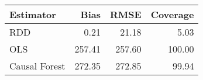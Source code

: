\begin{table}[ht]
\centering
\begin{tabular}{lrrr}
  \hline
Estimator & Bias & RMSE & Coverage \\ 
  \hline
RDD & 0.21 & 21.18 & 5.03 \\ 
  OLS & 257.41 & 257.60 & 100.00 \\ 
  Causal Forest & 272.35 & 272.85 & 99.94 \\ 
   \hline
\end{tabular}
\end{table}
